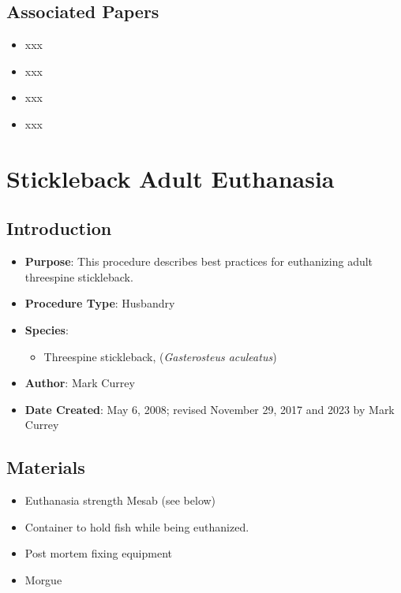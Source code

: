 \documentclass[
  letterpaper,
  DIV=11,
  numbers=noendperiod]{scrreprt}
\providecommand{\tightlist}{%
  \setlength{\itemsep}{0pt}\setlength{\parskip}{0pt}}\usepackage{longtable,booktabs,array}
\begin{document}
\hypertarget{associated-papers-10}{%
\section{Associated Papers}\label{associated-papers-10}}

\begin{itemize}
\tightlist
\item
  xxx
\item
  xxx
\item
  xxx
\item
  xxx
\end{itemize}

\hypertarget{sec-husb-adutl_sb_euthanasia}{%
\chapter{Stickleback Adult
Euthanasia}\label{sec-husb-adutl_sb_euthanasia}}

\hypertarget{introduction-18}{%
\section{Introduction}\label{introduction-18}}

\begin{itemize}
\tightlist
\item
  \textbf{Purpose}: This procedure describes best practices for
  euthanizing adult threespine stickleback.
\item
  \textbf{Procedure Type}: Husbandry
\item
  \textbf{Species}:

  \begin{itemize}
  \tightlist
  \item
    Threespine stickleback, (\emph{Gasterosteus aculeatus})
  \end{itemize}
\item
  \textbf{Author}: Mark Currey
\item
  \textbf{Date Created}: May 6, 2008; revised November 29, 2017 and 2023
  by Mark Currey
\end{itemize}

\hypertarget{materials-16}{%
\section{Materials}\label{materials-16}}

\begin{itemize}
\tightlist
\item
  Euthanasia strength Mesab (see below)
\item
  Container to hold fish while being euthanized.
\item
  Post mortem fixing equipment
\item
  Morgue
\end{itemize}
\end{document}
